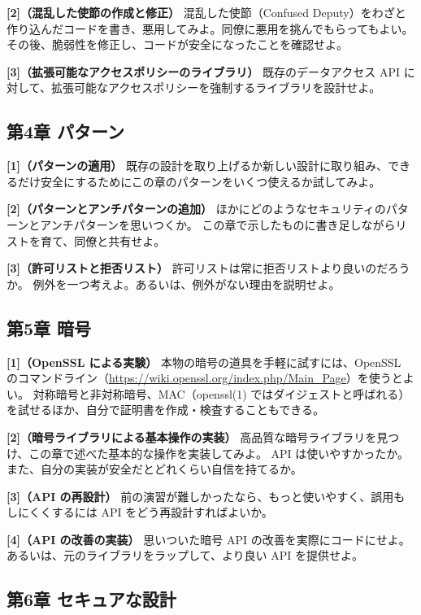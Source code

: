 \documentclass[uplatex]{jsarticle}
\begin{document}
\noindent\textbf{[2]（混乱した使節の作成と修正）}\quad
混乱した使節（Confused Deputy）をわざと作り込んだコードを書き、悪用してみよ。同僚に悪用を挑んでもらってもよい。
その後、脆弱性を修正し、コードが安全になったことを確認せよ。

\noindent\textbf{[3]（拡張可能なアクセスポリシーのライブラリ）}\quad
既存のデータアクセス API に対して、拡張可能なアクセスポリシーを強制するライブラリを設計せよ。

\subsection{第4章 パターン}

\noindent\textbf{[1]（パターンの適用）}\quad
既存の設計を取り上げるか新しい設計に取り組み、できるだけ安全にするためにこの章のパターンをいくつ使えるか試してみよ。

\noindent\textbf{[2]（パターンとアンチパターンの追加）}\quad
ほかにどのようなセキュリティのパターンとアンチパターンを思いつくか。
この章で示したものに書き足しながらリストを育て、同僚と共有せよ。

\noindent\textbf{[3]（許可リストと拒否リスト）}\quad
許可リストは常に拒否リストより良いのだろうか。
例外を一つ考えよ。あるいは、例外がない理由を説明せよ。

\subsection{第5章 暗号}

\noindent\textbf{[1]（OpenSSL による実験）}\quad
本物の暗号の道具を手軽に試すには、OpenSSL のコマンドライン（\url{https://wiki.openssl.org/index.php/Main_Page}）を使うとよい。
対称暗号と非対称暗号、MAC（openssl(1) ではダイジェストと呼ばれる）を試せるほか、自分で証明書を作成・検査することもできる。

\noindent\textbf{[2]（暗号ライブラリによる基本操作の実装）}\quad
高品質な暗号ライブラリを見つけ、この章で述べた基本的な操作を実装してみよ。
API は使いやすかったか。また、自分の実装が安全だとどれくらい自信を持てるか。

\noindent\textbf{[3]（API の再設計）}\quad
前の演習が難しかったなら、もっと使いやすく、誤用もしにくくするには API をどう再設計すればよいか。

\noindent\textbf{[4]（API の改善の実装）}\quad
思いついた暗号 API の改善を実際にコードにせよ。あるいは、元のライブラリをラップして、より良い API を提供せよ。

\subsection{第6章 セキュアな設計}
\end{document}
